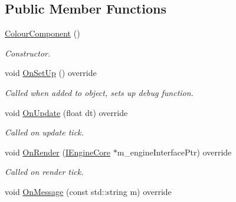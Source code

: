 \subsection*{Public Member Functions}
\begin{DoxyCompactItemize}
\item 
\mbox{\label{class_colour_component_aea6cf99fa40f6ed6d670e89fab944b1c}} 
\mbox{\hyperlink{class_colour_component_aea6cf99fa40f6ed6d670e89fab944b1c}{Colour\+Component}} ()
\begin{DoxyCompactList}\small\item\em Constructor. \end{DoxyCompactList}\item 
\mbox{\label{class_colour_component_a80105f216269f3282c51918a0d13c12d}} 
void \mbox{\hyperlink{class_colour_component_a80105f216269f3282c51918a0d13c12d}{On\+Set\+Up}} () override
\begin{DoxyCompactList}\small\item\em Called when added to object, sets up debug function. \end{DoxyCompactList}\item 
\mbox{\label{class_colour_component_ae45e91aebb680031bb1328c7c189ea15}} 
void \mbox{\hyperlink{class_colour_component_ae45e91aebb680031bb1328c7c189ea15}{On\+Update}} (float dt) override
\begin{DoxyCompactList}\small\item\em Called on update tick. \end{DoxyCompactList}\item 
\mbox{\label{class_colour_component_a2038d839286cb0a5f0eec0cc11780700}} 
void \mbox{\hyperlink{class_colour_component_a2038d839286cb0a5f0eec0cc11780700}{On\+Render}} (\mbox{\hyperlink{class_i_engine_core}{I\+Engine\+Core}} $\ast$m\+\_\+engine\+Interface\+Ptr) override
\begin{DoxyCompactList}\small\item\em Called on render tick. \end{DoxyCompactList}\item 
\mbox{\label{class_colour_component_a40b859f0c124ddbe92ff1e53bdb398a0}} 
void \mbox{\hyperlink{class_colour_component_a40b859f0c124ddbe92ff1e53bdb398a0}{On\+Message}} (const std\+::string m) override

\end{DoxyCompactItemize}
